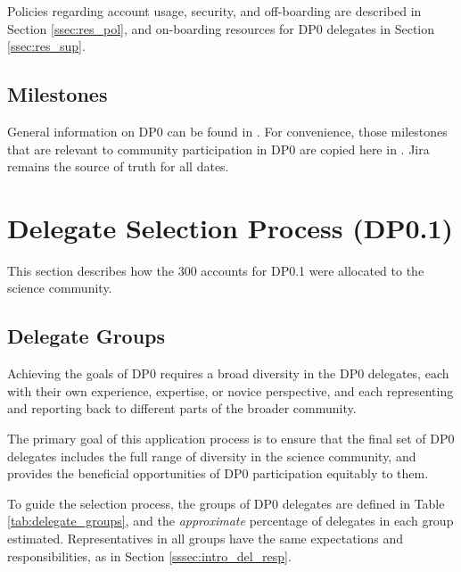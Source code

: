 \documentclass[DM,lsstdraft,authoryear,toc]{lsstdoc}
\begin{document}
Policies regarding account usage, security, and off-boarding are described in Section \ref{ssec:res_pol}, and on-boarding resources for DP0 delegates in Section \ref{ssec:res_sup}. 

\subsection{Milestones}
General information on DP0 can be found in .
For convenience, those milestones  that are relevant to community participation in DP0 are copied here in . 
Jira remains the source of truth for all dates. 


\section{Delegate Selection Process (DP0.1)}\label{sec:sel}

This section describes how the 300 accounts for DP0.1 were allocated to the science community.

\subsection{Delegate Groups}\label{ssec:sel_grps}

Achieving the goals of DP0 requires a broad diversity in the DP0 delegates, each with their own experience, expertise, or novice perspective, and each representing and reporting back to different parts of the broader community.

The primary goal of this application process is to ensure that the final set of DP0 delegates includes the full range of diversity in the science community, and provides the beneficial opportunities of DP0 participation equitably to them.

To guide the selection process, the groups of DP0 delegates are defined in Table \ref{tab:delegate_groups}, and the \emph{approximate} percentage of delegates in each group estimated.
Representatives in all groups have the same expectations and responsibilities, as in Section \ref{sssec:intro_del_resp}.
\end{document}
